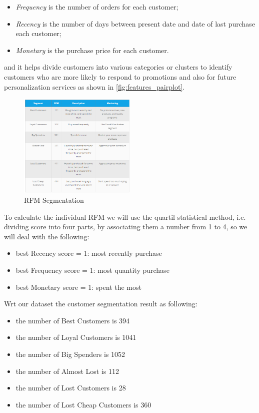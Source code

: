\begin{itemize}
\item \emph{Frequency} is the number of orders for each customer;
\item \emph{Recency} is the number of days between present date and date of last purchase each customer;
\item \emph{Monetary} is the purchase price for each customer.
\end{itemize}

and it helps divide customers into various categories or clusters to identify customers who are more likely to respond to promotions and also for future personalization services as shown in \ref{fig:features_pairplot}.

\begin{figure}[!h]
\centering
\includegraphics[width=0.5\textwidth]{img/preparation/rfm_seg.png}
\caption{RFM Segmentation}
\label{fig:rfm_seg}
\end{figure}

To calculate the individual RFM we will use the quartil statistical method, i.e. dividing score into four parts, by associating them a number from 1 to 4, so we will deal with the following:

\begin{itemize}
\item best Recency score = 1: most recently purchase
\item best Frequency score = 1: most quantity purchase
\item best Monetary score = 1: spent the most
\end{itemize}

Wrt our dataset the customer segmentation result as following:

\begin{itemize}
\item the number of Best Customers is 394
\item the number of Loyal Customers is 1041
\item the number of Big Spenders is 1052
\item the number of Almost Lost is 112
\item the number of Lost Customers is 28
\item the number of Lost Cheap Customers is 360
\end{itemize}

